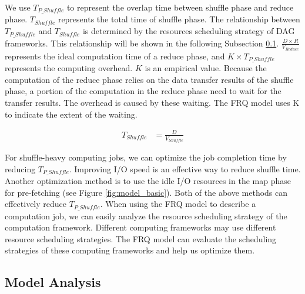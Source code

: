 {We use \(T_{P\_Shuffle}\) to represent the overlap time between shuffle phase and reduce phase. \(T_{Shuffle}\) represents the total time of shuffle phase. 
The relationship between \(T_{P\_Shuffle}\) and \(T_{Shuffle}\) is determined by the resources scheduling strategy of DAG frameworks. This relationship will be shown in the following Subsection \ref{model_analysis}.  
\(\frac{D \times R}{V_{Reduce}}\) represents the ideal computation time of a reduce phase, and \(K \times T_{P\_Shuffle}\) represents the computing overhead. \(K\) is an empirical value. 
Because the computation of the reduce phase relies on the data transfer results of the shuffle phase, a portion of the computation in the reduce phase need to wait for the transfer results. The overhead is caused by these waiting. The FRQ model uses K to indicate the extent of the waiting.

\begin{equation}
\label{equation_Tshuffle}
\begin{aligned}
    T_{Shuffle} &= {{\frac{D}{V_{Shuffle}}}}
\end{aligned}
\end{equation}

For shuffle-heavy computing jobs, we can optimize the job completion time by reducing \(T_{P\_Shuffle}\). Improving I/O speed is an effective way to reduce shuffle time. Another optimization method is to use the idle I/O resources in the map phase for pre-fetching (see Figure \ref{fig:model_basic}). Both of the above methods can effectively reduce \(T_{P\_Shuffle}\). When using the FRQ model to describe a computation job, we can easily analyze the resource scheduling strategy of the computation framework. Different computing frameworks may use different resource scheduling strategies. The FRQ model can evaluate the scheduling strategies of these computing frameworks and help us optimize them.

\subsection{Model Analysis}\label{model_analysis}

}
